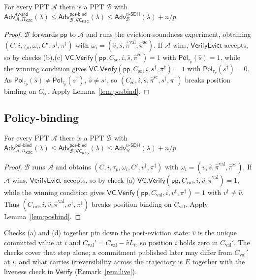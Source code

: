 \documentclass[version=preprint]{iacrcc}
\theoremstyle{definition}
\newcommand{\secpar}{\lambda}
\newcommand{\PPT}{\mathrm{PPT}}
\newcommand{\Vfy}{\mathsf{Verify}}
\newcommand{\VfyEvict}{\mathsf{VerifyEvict}}
\newcommand{\pp}{\mathsf{pp}}
\newcommand{\Pol}{\mathsf{Pol}}
\newcommand{\Adv}{\mathsf{Adv}}
\newcommand{\Val}{\mathrm{val}}
\newcommand{\Sc}{\mathrm{sc}}
\newcommand{\Cval}{C_{\Val}}
\newcommand{\Csc}{C_{\Sc}}
\newcommand{\Evicted}{E}
\newcommand{\A}{\mathcal{A}}
\newcommand{\B}{\mathcal{B}}
\newcommand{\VC}{\mathsf{VC}}
\newcommand{\nsdh}{n\text{-}\mathsf{SDH}}
\newcommand{\posbind}{\mathsf{pos\text{-}bind}}
\newcommand{\evsnd}{\mathsf{ev\text{-}snd}}
\newcommand{\polbind}{\mathsf{pol\text{-}bind}}
\begin{document}
\begin{theorem}\label{thm:evsnd}
For every $\PPT$ $\A$ there is a $\PPT$ $\B$ with
$\Adv^{\evsnd}_{\A,\Pi_{\mathsf{KZG}}}(\secpar)\le
 \Adv^{\posbind}_{\B,\VC_{\mathsf{KZG}}}(\secpar)\le\Adv^{\nsdh}_{\B}(\secpar)+n/p$.
\end{theorem}
\begin{proof}
$\B$ forwards $\pp$ to $\A$ and runs the eviction-soundness experiment, obtaining
$(C,i,\tau_{\!p},\omega_i,C',s^{\dagger},\pi^{\dagger})$ with
$\omega_i=(\hat v,\hat s,\hat\pi^{\Val},\hat\pi^{\Sc})$. If $\A$ wins,
$\VfyEvict$ accepts, so by checks (b),(c)
$\VC.\Vfy(\pp,\Csc,i,\hat s,\hat\pi^{\Sc})=1$ with $\Pol_{\tau_{\!p}}(\hat s)=1$,
while the winning condition gives
$\VC.\Vfy(\pp,\Csc,i,s^{\dagger},\pi^{\dagger})=1$ with
$\Pol_{\tau_{\!p}}(s^{\dagger})=0$. As $\Pol_{\tau_{\!p}}(\hat s)\neq
\Pol_{\tau_{\!p}}(s^{\dagger})$, $\hat s\neq s^{\dagger}$, so
$(\Csc,i,\hat s,\hat\pi^{\Sc},s^{\dagger},\pi^{\dagger})$ breaks position binding
on $\Csc$. Apply Lemma~\ref{lem:posbind}.
\end{proof}

\subsection{Policy-binding}

\begin{theorem}\label{thm:polbind}
For every $\PPT$ $\A$ there is a $\PPT$ $\B$ with
$\Adv^{\polbind}_{\A,\Pi_{\mathsf{KZG}}}(\secpar)\le
 \Adv^{\posbind}_{\B,\VC_{\mathsf{KZG}}}(\secpar)\le\Adv^{\nsdh}_{\B}(\secpar)+n/p$.
\end{theorem}
\begin{proof}
$\B$ runs $\A$ and obtains
$(C,i,\tau_{\!p},\omega_i,C',v^{\dagger},\pi^{\dagger})$ with
$\omega_i=(\hat v,\hat s,\hat\pi^{\Val},\hat\pi^{\Sc})$. If $\A$ wins,
$\VfyEvict$ accepts, so by check (a)
$\VC.\Vfy(\pp,\Cval,i,\hat v,\hat\pi^{\Val})=1$, while the winning condition gives
$\VC.\Vfy(\pp,\Cval,i,v^{\dagger},\pi^{\dagger})=1$ with $v^{\dagger}\neq\hat v$.
Thus $(\Cval,i,\hat v,\hat\pi^{\Val},v^{\dagger},\pi^{\dagger})$ breaks position
binding on $\Cval$. Apply Lemma~\ref{lem:posbind}.
\end{proof}

\begin{remark}
Checks (a) and (d) together pin down the post-eviction state: $\hat v$ is the
unique committed value at $i$ and $\Cval'=\Cval-\hat v L_i$, so position $i$
holds zero in $\Cval'$. The checks cover that step alone; a commitment published
later may differ from $\Cval'$ at $i$, and what carries irreversibility across
the trajectory is $\Evicted$ together with the liveness check in $\Vfy$
(Remark~\ref{rem:live}).
\end{remark}
\end{document}
